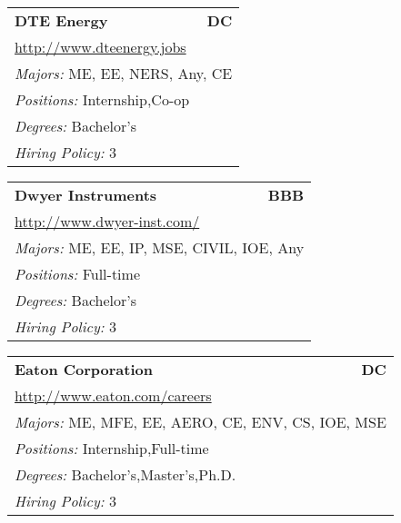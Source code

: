 \documentclass[twoside]{article}
\begin{document}
\begin{center}
\begin{multicols}{3}
\begin{FlushLeft}
\begin{minipage}{\columnwidth}
\end{minipage}
 
\begin{minipage}{\columnwidth}\begin{tabularx}{.95\columnwidth}{Xr}
                 {\Large\bf DTE Energy} & {\Large\bf DC}\\
    \multicolumn{2}{p{.95\columnwidth}}{\url{http://www.dteenergy.jobs}}\\
    \multicolumn{2}{p{.95\columnwidth}}{\emph{Majors:} ME, EE, NERS, Any, CE}\\
    \multicolumn{2}{p{.95\columnwidth}}{\emph{Positions:} Internship,Co-op}\\
    \multicolumn{2}{p{.95\columnwidth}}{\emph{Degrees:} Bachelor's}\\
    \multicolumn{2}{p{.95\columnwidth}}{\emph{Hiring Policy:} 3}\\
    \end{tabularx}
    
\end{minipage}
 
\begin{minipage}{\columnwidth}\begin{tabularx}{.95\columnwidth}{Xr}
                 {\Large\bf Dwyer Instruments} & {\Large\bf BBB}\\
    \multicolumn{2}{p{.95\columnwidth}}{\url{http://www.dwyer-inst.com/}}\\
    \multicolumn{2}{p{.95\columnwidth}}{\emph{Majors:} ME, EE, IP, MSE, CIVIL, IOE, Any}\\
    \multicolumn{2}{p{.95\columnwidth}}{\emph{Positions:} Full-time}\\
    \multicolumn{2}{p{.95\columnwidth}}{\emph{Degrees:} Bachelor's}\\
    \multicolumn{2}{p{.95\columnwidth}}{\emph{Hiring Policy:} 3}\\
    \end{tabularx}
    
\end{minipage}
 
\begin{minipage}{\columnwidth}\begin{tabularx}{.95\columnwidth}{Xr}
                 {\Large\bf Eaton Corporation} & {\Large\bf DC}\\
    \multicolumn{2}{p{.95\columnwidth}}{\url{http://www.eaton.com/careers}}\\
    \multicolumn{2}{p{.95\columnwidth}}{\emph{Majors:} ME, MFE, EE, AERO, CE, ENV, CS, IOE, MSE}\\
    \multicolumn{2}{p{.95\columnwidth}}{\emph{Positions:} Internship,Full-time}\\
    \multicolumn{2}{p{.95\columnwidth}}{\emph{Degrees:} Bachelor's,Master's,Ph.D.}\\
    \multicolumn{2}{p{.95\columnwidth}}{\emph{Hiring Policy:} 3}\\
    \end{tabularx}
    

\end{minipage}
\end{FlushLeft}
\end{multicols}
\end{center}
\end{document}
